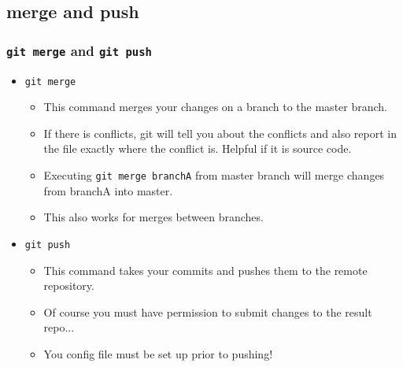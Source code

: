 \documentclass{beamer}
\begin{document}
\subsection{merge and push}
\begin{frame}
    \frametitle{\texttt{git merge} and \texttt{git push}}
    \begin{itemize}
        \item{\texttt{git merge}}
        \begin{itemize}
            \item{This command merges your changes on a branch to the master branch.}
            \item{If there is conflicts, git will tell you about the conflicts and also report in the file exactly where the conflict is. Helpful if it is source code.}
            \item{Executing \texttt{git merge branchA} from master branch will merge changes from branchA into master.}
            \item{This also works for merges between branches.}
        \end{itemize}

    \item{\texttt{git push}}
        \begin{itemize}
            \item{This command takes your commits and pushes them to the remote repository.}
            \item{Of course you must have permission to submit changes to the result repo...}
            \item{You config file must be set up prior to pushing!}
        \end{itemize}

    \end{itemize}
\end{frame}
\end{document}
